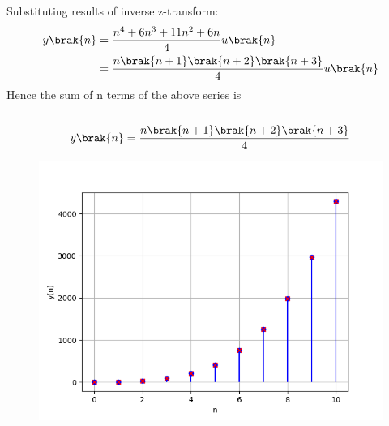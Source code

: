 \documentclass[journal,12pt,twocolumn]{IEEEtran}
\theoremstyle{remark}
\begin{document}
Substituting results of inverse z-transform:
\begin{align}
 y\brak{n} &= \frac{n^4 + 6n^3 + 11n^2 + 6n}{4}u\brak{n}\\
    &= \frac{n\brak{n+1}\brak{n+2}\brak{n+3}}{4}u\brak{n}
\end{align}
Hence the sum of n terms of the above series is \\\\
\begin{align}
y \brak{n} = \frac{n \brak{n+1} \brak{n+2} \brak{n+3}}{4}
\end{align}
\begin{figure}[ht]
    \centering
    \includegraphics[width=\columnwidth]{figs/fig4.png}
    \label{fig: 10.5.3.12}
\end{figure}
\end{document}
